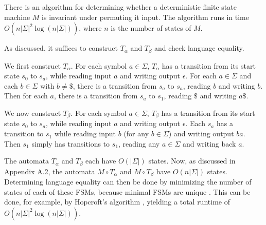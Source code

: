\documentclass{llncs}
\begin{document}
    \begin{theorem}
      There is an algorithm for determining whether a deterministic finite state
      machine $M$ is invariant under permuting it input.
      The algorithm runs in time $O(n|\Sigma|^2\log(n|\Sigma|))$,
      where $n$ is the number of states of $M$.
    \end{theorem}

    As discussed, it suffices to construct $T_\alpha$ and $T_\beta$
    and check language equality.

    We first construct $T_\alpha$.
    For each symbol $a \in \Sigma$,
    $T_\alpha$ has a transition from its start
    state $s_0$ to $s_a$, while reading input $a$ and
    writing output $\epsilon$.
    For each $a\in \Sigma$ and each $b\in\Sigma$ with $b\ne \$$, there is a
    transition from $s_a$ to $s_a$, reading $b$
    and writing $b$.
    Then for each $a$, there is a transition from
    $s_a$ to $s_1$, reading $\$$ and writing $a\$$.

    We now construct $T_\beta$.
    For each symbol $a \in \Sigma$,
    $T_\beta$ has a transition from its start
    state $s_0$ to $s_a$, while reading input $a$ and
    writing output $\epsilon$.
    Each $s_a$ has a transition to $s_1$ while
    reading input $b$ (for any $b\in \Sigma$)
    and writing output $ba$.
    Then $s_1$ simply has transitions to $s_1$,
    reading any $a\in \Sigma$ and writing
    back $a$.

    The automata $T_\alpha$ and $T_\beta$ each have $O(|\Sigma|)$ states.
    Now, as discussed in Appendix A.2, the automata 
    $M \circ T_\alpha$ and $M \circ T_\beta$ have $O(n|\Sigma|)$ states.
    Determining language equality can then be done by minimizing the number of
    states of each of these FSMs, because minimal FSMs are unique \cite{hopcroft71}.
    This can be done, for example, by Hopcroft's algorithm \cite{hopcroft71},
    yielding a total runtime of $O(n|\Sigma|^2\log(n|\Sigma|))$.
\end{document}
